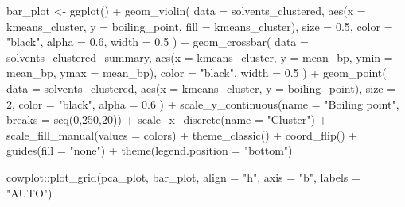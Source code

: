 \documentclass[
]{krantz}
\newenvironment{Shaded}{\begin{snugshade}}{\end{snugshade}}
\newcommand{\AttributeTok}[1]{\textcolor[rgb]{0.77,0.63,0.00}{#1}}
\newcommand{\DecValTok}[1]{\textcolor[rgb]{0.00,0.00,0.81}{#1}}
\newcommand{\FloatTok}[1]{\textcolor[rgb]{0.00,0.00,0.81}{#1}}
\newcommand{\FunctionTok}[1]{\textcolor[rgb]{0.00,0.00,0.00}{#1}}
\newcommand{\NormalTok}[1]{#1}
\newcommand{\OtherTok}[1]{\textcolor[rgb]{0.56,0.35,0.01}{#1}}
\newcommand{\SpecialCharTok}[1]{\textcolor[rgb]{0.00,0.00,0.00}{#1}}
\newcommand{\StringTok}[1]{\textcolor[rgb]{0.31,0.60,0.02}{#1}}
\begin{document}
\begin{Shaded}
\begin{Highlighting}[]
\NormalTok{bar\_plot }\OtherTok{\textless{}{-}} \FunctionTok{ggplot}\NormalTok{() }\SpecialCharTok{+} 
  \FunctionTok{geom\_violin}\NormalTok{(}
    \AttributeTok{data =}\NormalTok{ solvents\_clustered,}
    \FunctionTok{aes}\NormalTok{(}\AttributeTok{x =}\NormalTok{ kmeans\_cluster, }\AttributeTok{y =}\NormalTok{ boiling\_point, }\AttributeTok{fill =}\NormalTok{ kmeans\_cluster),}
    \AttributeTok{size =} \FloatTok{0.5}\NormalTok{, }\AttributeTok{color =} \StringTok{"black"}\NormalTok{, }\AttributeTok{alpha =} \FloatTok{0.6}\NormalTok{, }\AttributeTok{width =} \FloatTok{0.5}
\NormalTok{  ) }\SpecialCharTok{+}
  \FunctionTok{geom\_crossbar}\NormalTok{(}
    \AttributeTok{data =}\NormalTok{ solvents\_clustered\_summary,}
    \FunctionTok{aes}\NormalTok{(}\AttributeTok{x =}\NormalTok{ kmeans\_cluster, }\AttributeTok{y =}\NormalTok{ mean\_bp, }\AttributeTok{ymin =}\NormalTok{ mean\_bp, }\AttributeTok{ymax =}\NormalTok{ mean\_bp),}
    \AttributeTok{color =} \StringTok{"black"}\NormalTok{, }\AttributeTok{width =} \FloatTok{0.5}
\NormalTok{  ) }\SpecialCharTok{+}
  \FunctionTok{geom\_point}\NormalTok{(}
    \AttributeTok{data =}\NormalTok{ solvents\_clustered,}
    \FunctionTok{aes}\NormalTok{(}\AttributeTok{x =}\NormalTok{ kmeans\_cluster, }\AttributeTok{y =}\NormalTok{ boiling\_point),}
    \AttributeTok{size =} \DecValTok{2}\NormalTok{, }\AttributeTok{color =} \StringTok{"black"}\NormalTok{, }\AttributeTok{alpha =} \FloatTok{0.6}
\NormalTok{  ) }\SpecialCharTok{+}
  \FunctionTok{scale\_y\_continuous}\NormalTok{(}\AttributeTok{name =} \StringTok{"Boiling point"}\NormalTok{, }\AttributeTok{breaks =} \FunctionTok{seq}\NormalTok{(}\DecValTok{0}\NormalTok{,}\DecValTok{250}\NormalTok{,}\DecValTok{20}\NormalTok{)) }\SpecialCharTok{+}
  \FunctionTok{scale\_x\_discrete}\NormalTok{(}\AttributeTok{name =} \StringTok{"Cluster"}\NormalTok{) }\SpecialCharTok{+}
  \FunctionTok{scale\_fill\_manual}\NormalTok{(}\AttributeTok{values =}\NormalTok{ colors) }\SpecialCharTok{+}
  \FunctionTok{theme\_classic}\NormalTok{() }\SpecialCharTok{+}
  \FunctionTok{coord\_flip}\NormalTok{() }\SpecialCharTok{+}
  \FunctionTok{guides}\NormalTok{(}\AttributeTok{fill =} \StringTok{"none"}\NormalTok{) }\SpecialCharTok{+}
  \FunctionTok{theme}\NormalTok{(}\AttributeTok{legend.position =} \StringTok{"bottom"}\NormalTok{)}

\NormalTok{cowplot}\SpecialCharTok{::}\FunctionTok{plot\_grid}\NormalTok{(pca\_plot, bar\_plot, }\AttributeTok{align =} \StringTok{"h"}\NormalTok{, }\AttributeTok{axis =} \StringTok{"b"}\NormalTok{, }\AttributeTok{labels =} \StringTok{"AUTO"}\NormalTok{)}
\end{Highlighting}
\end{Shaded}
\end{document}
